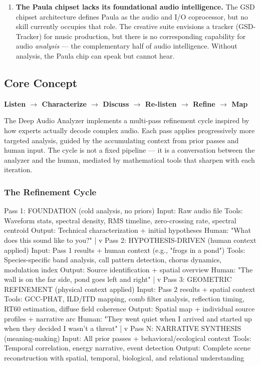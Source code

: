 \documentclass[11pt,letterpaper]{article}
\begin{document}
\begin{enumerate}[leftmargin=2em]
\item \textbf{The Paula chipset lacks its foundational audio intelligence.} The GSD chipset architecture defines Paula as the audio and I/O coprocessor, but no skill currently occupies that role. The creative suite envisions a tracker (GSD-Tracker) for music production, but there is no corresponding capability for audio \textit{analysis} --- the complementary half of audio intelligence. Without analysis, the Paula chip can speak but cannot hear.
\end{enumerate}

\subsection{Core Concept}

\textbf{Listen $\rightarrow$ Characterize $\rightarrow$ Discuss $\rightarrow$ Re-listen $\rightarrow$ Refine $\rightarrow$ Map}

The Deep Audio Analyzer implements a multi-pass refinement cycle inspired by how experts actually decode complex audio. Each pass applies progressively more targeted analysis, guided by the accumulating context from prior passes and human input. The cycle is not a fixed pipeline --- it is a conversation between the analyzer and the human, mediated by mathematical tools that sharpen with each iteration.

\subsubsection{The Refinement Cycle}

\begin{asciibox}
Pass 1: FOUNDATION (cold analysis, no priors)
  Input:  Raw audio file
  Tools:  Waveform stats, spectral density, RMS timeline,
          zero-crossing rate, spectral centroid
  Output: Technical characterization + initial hypotheses
  Human:  "What does this sound like to you?"
            |
            v
Pass 2: HYPOTHESIS-DRIVEN (human context applied)
  Input:  Pass 1 results + human context (e.g., "frogs in a pond")
  Tools:  Species-specific band analysis, call pattern detection,
          chorus dynamics, modulation index
  Output: Source identification + spatial overview
  Human:  "The wall is on the far side, pond goes left and right"
            |
            v
Pass 3: GEOMETRIC REFINEMENT (physical context applied)
  Input:  Pass 2 results + spatial context
  Tools:  GCC-PHAT, ILD/ITD mapping, comb filter analysis,
          reflection timing, RT60 estimation, diffuse field coherence
  Output: Spatial map + individual source profiles + narrative arc
  Human:  "They went quiet when I arrived and started up when
           they decided I wasn't a threat"
            |
            v
Pass N: NARRATIVE SYNTHESIS (meaning-making)
  Input:  All prior passes + behavioral/ecological context
  Tools:  Temporal correlation, energy narrative, event detection
  Output: Complete scene reconstruction with spatial, temporal,
          biological, and relational understanding
\end{asciibox}
\end{document}
